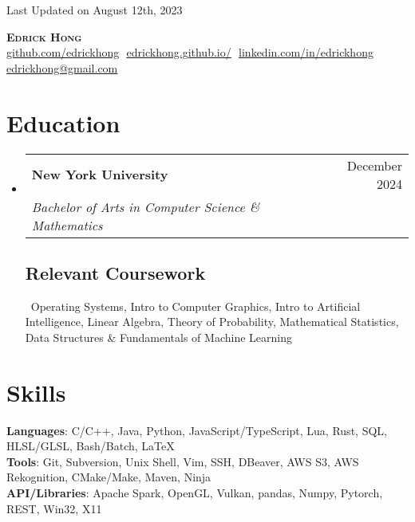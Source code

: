 \documentclass[letterpaper,11pt]{article}
\makeatletter
\newcommand{\resumeSubheading}[4]{
  \vspace{-2pt}\item
    \begin{tabular*}{0.97\textwidth}[t]{l@{\extracolsep{\fill}}r}
      \textbf{#1} & #2 \\
      \textit{\small#3} & \textit{\small #4} \\
    \end{tabular*}\vspace{-7pt}
}
\newcommand{\resumeSubHeadingListStart}{\begin{itemize}[leftmargin=0.15in, label={}]}
\newcommand{\resumeSubHeadingListEnd}{\end{itemize}}
\makeatother
\begin{document}
\begin{flushright}
  \vspace{-4pt}
  \color{gray}
  \item
  Last Updated on August 12th, 2023
\end{flushright}

\vspace{-7pt}

\begin{center}
    \textbf{\Huge \scshape Edrick Hong} \\ \vspace{8pt}
    \small 
    \href{https://github.com/edrickhong}{\underline{github.com/edrickhong}} $  $
    \href{https://github.com/edrickhong/project_pages/wiki}
    {\underline{edrickhong.github.io/}} $  $
    \href{https://www.linkedin.com/in/edrick-hong-966abb244/}{\underline{linkedin.com/in/edrickhong}} $  $
    \href{mailto:edrickhong@gmail.com}
    {\underline{edrickhong@gmail.com}}
\end{center}

\section{Education}
  \resumeSubHeadingListStart
  
    \resumeSubheading
      {New York University}{December 2024}
      {Bachelor of Arts in Computer Science \& Mathematics}{}

    \vspace{-10pt}
    \subsection{Relevant Coursework}
      \ Operating Systems, Intro to Computer Graphics, Intro to Artificial Intelligence, Linear Algebra, Theory of Probability, Mathematical Statistics, Data Structures \& Fundamentals of Machine Learning\

  \resumeSubHeadingListEnd

\section{Skills}
 \begin{itemize}[leftmargin=0.15in, label={}]
    \small{\item{
    
     \textbf{Languages}{: C/C++, Java, Python, JavaScript/TypeScript, Lua, Rust, SQL, HLSL/GLSL, Bash/Batch, \LaTeX} \\
     
     \textbf{Tools}{: Git, Subversion, Unix Shell, Vim, SSH, DBeaver, AWS S3, AWS Rekognition, CMake/Make, Maven, Ninja} \\
     
      \textbf{API/Libraries}{: Apache Spark, OpenGL, Vulkan, pandas, Numpy, Pytorch, REST, Win32, X11} \\
     
    }}
 \end{itemize}
\end{document}
